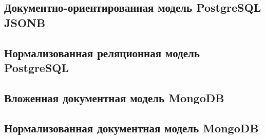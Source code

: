 \subsection{Документно-ориентированная модель PostgreSQL JSONB}


\subsection{Нормализованная реляционная модель PostgreSQL}


\subsection{Вложенная документная модель MongoDB}


\subsection{Нормализованная документная модель MongoDB}
